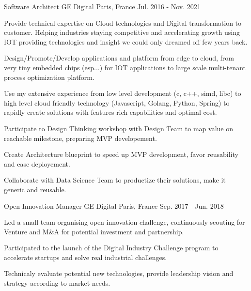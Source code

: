 \begin{cventries}
  \cventry
    {Software Architect} %
    {GE Digital} %
    {Paris, France} %
    {Jul. 2016 - Nov. 2021} %
    {
      \begin{cvitems} %
        \item {Provide technical expertise on Cloud technologies and Digital transformation to customer. Helping industries staying competitive and accelerating growth using IOT providing technologies and insight we could only dreamed off few years back.}
        \item {Design/Promote/Develop applications and platform from edge to cloud, from very tiny embedded chips (esp...) for IOT applications to large scale multi-tenant process optimization platform.}
        \item {Use my extensive experience from low level development (c, c++, simd, libc) to high level cloud friendly technology (Javascript, Golang, Python, Spring) to rapidly create solutions with features rich capabilities and optimal cost.}
        \item {Participate to Design Thinking workshop with Design Team to map value on reachable milestone, preparing MVP developement.}
        \item {Create Architecture blueprint to speed up MVP development, favor reusability and ease deployement. }
        \item {Collaborate with Data Science Team to productize their solutions, make it generic and reusable.}
      \end{cvitems}
    }


  \cventry
    {Open Innovation Manager} %
    {GE Digital} %
    {Paris, France} %
    {Sep. 2017 - Jun. 2018} %
    {
      \begin{cvitems} %
        \item {Led a small team organising open innovation challenge, continuously scouting for Venture and M\&A for potential investment and partnership.}
        \item {Participated to the launch of the Digital Industry Challenge program to accelerate startups and solve real industrial challenges.}
        \item {Technicaly evaluate potential new technologies, provide leadership vision and strategy according to market needs.}
      \end{cvitems}
    }


\end{cventries}
